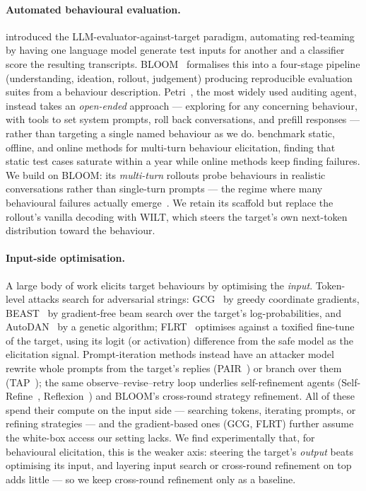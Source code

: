 \documentclass{article}
\theoremstyle{plain}
\theoremstyle{definition}
\theoremstyle{remark}
\begin{document}
\paragraph{Automated behavioural evaluation.}
\citet{perez2022redteaming} introduced the LLM-evaluator-against-target paradigm, automating red-teaming by having one language model generate test inputs for another and a classifier score the resulting transcripts.
BLOOM~\citep{gupta2025bloom} formalises this into a four-stage pipeline (understanding, ideation, rollout, judgement) producing reproducible evaluation suites from a behaviour description.
Petri~\citep{fronsdal2025petri}, the most widely used auditing agent, instead takes an \emph{open-ended} approach --- exploring for any concerning behaviour, with tools to set system prompts, roll back conversations, and prefill responses --- rather than targeting a single named behaviour as we do.
\citet{huang2025multiturn} benchmark static, offline, and online methods for multi-turn behaviour elicitation, finding that static test cases saturate within a year while online methods keep finding failures.
We build on BLOOM: its \emph{multi-turn} rollouts probe behaviours in realistic conversations rather than single-turn prompts --- the regime where many behavioural failures actually emerge~\citep{russinovich2024crescendo,anil2024manyshot}.
We retain its scaffold but replace the rollout's vanilla decoding with WILT, which steers the target's own next-token distribution toward the behaviour.


\paragraph{Input-side optimisation.}
A large body of work elicits target behaviours by optimising the \emph{input}.
Token-level attacks search for adversarial strings: GCG~\citep{zou2023universal} by greedy coordinate gradients, BEAST~\citep{sadasivan2024fast} by gradient-free beam search over the target's log-probabilities, and AutoDAN~\citep{liu2023autodan} by a genetic algorithm; FLRT~\citep{thompson2024flrt} optimises against a toxified fine-tune of the target, using its logit (or activation) difference from the safe model as the elicitation signal.
Prompt-iteration methods instead have an attacker model rewrite whole prompts from the target's replies (PAIR~\citep{chao2023jailbreaking}) or branch over them (TAP~\citep{mehrotra2023tap}); the same observe--revise--retry loop underlies self-refinement agents (Self-Refine~\citep{madaan2023selfrefine}, Reflexion~\citep{shinn2023reflexion}) and BLOOM's cross-round strategy refinement.
All of these spend their compute on the input side --- searching tokens, iterating prompts, or refining strategies --- and the gradient-based ones (GCG, FLRT) further assume the white-box access our setting lacks.
We find experimentally that, for behavioural elicitation, this is the weaker axis: steering the target's \emph{output} beats optimising its input, and layering input search or cross-round refinement on top adds little --- so we keep cross-round refinement only as a baseline.
\end{document}

